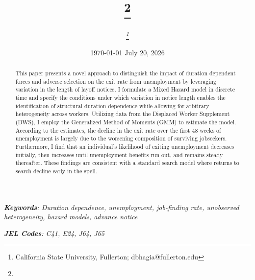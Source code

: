 \documentclass{div}
\title{\vspace{-1cm} \Large \setstretch{1.25} \sc{Duration Dependence and Heterogeneity: \\ Learning from Early Notice of Layoff}\thanks{\mythanks}\vspace{-0.75em}}
\author{\textit{\sc{Div Bhagia}\thanks{California State University, Fullerton; dbhagia@fullerton.edu}}}
\date{\vspace{-0.25cm} \today}
\date{\vspace{-0.25cm} July 20, 2026}
\begin{document}
\maketitle
\vspace{-0.75cm}

\begin{abstract}
This paper presents a novel approach to distinguish the impact of duration dependent forces and adverse selection on the exit rate from unemployment by leveraging variation in the length of layoff notices. I formulate a Mixed Hazard model in discrete time and specify the conditions under which variation in notice length enables the identification of structural duration dependence while allowing for arbitrary heterogeneity across workers. Utilizing data from the Displaced Worker Supplement (DWS), I employ the Generalized Method of Moments (GMM) to estimate the model. According to the estimates, the decline in the exit rate over the first 48 weeks of unemployment is largely due to the worsening composition of surviving jobseekers. Furthermore, I find that an individual's likelihood of exiting unemployment decreases initially, then increases until unemployment benefits run out, and remains steady thereafter. These findings are consistent with a standard search model where returns to search decline early in the spell.
\end{abstract}

\begin{center}
\begin{minipage}{0.875\textwidth}
 \noindent
\textit{\textbf{Keywords}: Duration dependence, unemployment, job-finding rate, unobserved heterogeneity, hazard models, advance notice} \\
\vspace{-1em}

\noindent \textit{\textbf{JEL Codes}: C41, E24, J64, J65}	
\end{minipage}
\end{center}

\setlength{\abovedisplayshortskip}{-0.1cm}
\setlength{\belowdisplayshortskip}{0.25cm}
\setlength{\abovedisplayskip}{0.25cm}
\setlength{\belowdisplayskip}{0.25cm}
\end{document}
